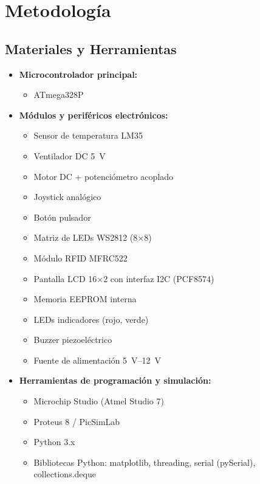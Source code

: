 \section{Metodología}

\subsection{Materiales y Herramientas}

\begin{itemize}
    \item \textbf{Microcontrolador principal:}
    \begin{itemize}
        \item ATmega328P
    \end{itemize}

    \item \textbf{Módulos y periféricos electrónicos:}
    \begin{itemize}
        \item Sensor de temperatura LM35
        \item Ventilador DC 5~V
        \item Motor DC + potenciómetro acoplado
        \item Joystick analógico
        \item Botón pulsador
        \item Matriz de LEDs WS2812 (8×8)
        \item Módulo RFID MFRC522
        \item Pantalla LCD 16×2 con interfaz I2C (PCF8574)
        \item Memoria EEPROM interna
        \item LEDs indicadores (rojo, verde)
        \item Buzzer piezoeléctrico
        \item Fuente de alimentación 5~V–12~V
    \end{itemize}

    \item \textbf{Herramientas de programación y simulación:}
    \begin{itemize}
        \item Microchip Studio (Atmel Studio 7)
        \item Proteus 8 / PicSimLab
        \item Python 3.x
        \item Bibliotecas Python: matplotlib, threading, serial (pySerial), collections.deque
    \end{itemize}
\end{itemize}



